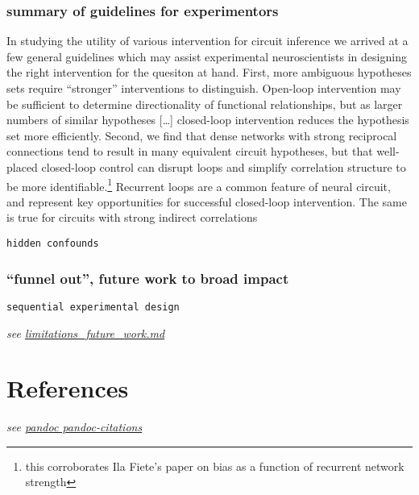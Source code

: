 \hypertarget{summary-of-guidelines-for-experimentors}{%
\subsubsection{summary of guidelines for
experimentors}\label{summary-of-guidelines-for-experimentors}}

In studying the utility of various intervention for circuit inference we
arrived at a few general guidelines which may assist experimental
neuroscientists in designing the right intervention for the quesiton at
hand. First, more ambiguous hypotheses sets require ``stronger''
interventions to distinguish. Open-loop intervention may be sufficient
to determine directionality of functional relationships, but as larger
numbers of similar hypotheses {[}\ldots{]} closed-loop intervention
reduces the hypothesis set more efficiently. Second, we find that dense
networks with strong reciprocal connections tend to result in many
equivalent circuit hypotheses, but that well-placed closed-loop control
can disrupt loops and simplify correlation structure to be more
identifiable.\footnote{this corroborates Ila Fiete's paper on bias as a
  function of recurrent network strength} Recurrent loops are a common
feature of neural circuit, and represent key opportunities for
successful closed-loop intervention. The same is true for circuits with
strong indirect correlations

\texttt{hidden\ confounds}

\hypertarget{funnel-out-future-work-to-broad-impact}{%
\subsubsection{``funnel out'', future work to broad
impact}\label{funnel-out-future-work-to-broad-impact}}

\texttt{sequential\ experimental\ design}

\emph{see
\href{/sketches_and_notation/discussion/limitations_future_work.md}{limitations\_future\_work.md}}

\hypertarget{references}{%
\section{References}\label{references}}

\emph{see
\href{https://github.com/shd101wyy/markdown-preview-enhanced/blob/master/docs/pandoc-bibliographies-and-citations.md}{pandoc
pandoc-citations}}
